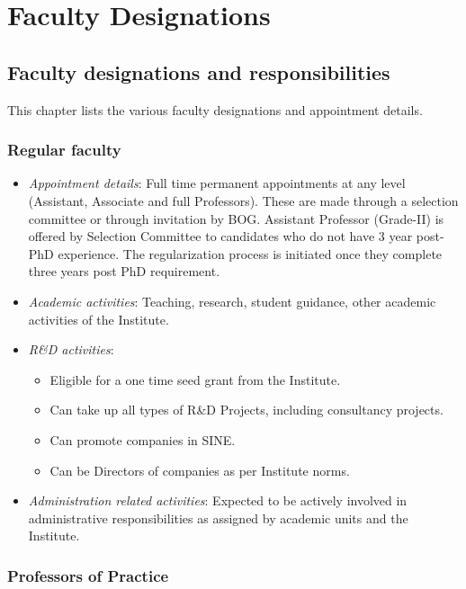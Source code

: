 \documentclass[
  10pt,
  a5paper,
  10pt,
  openany]{amsbook}
\providecommand{\tightlist}{%
  \setlength{\itemsep}{0pt}\setlength{\parskip}{0pt}}
\begin{document}
\part{Faculty Designations}

\chapter{Faculty designations and
responsibilities}\label{sec:facultygrades}

This chapter lists the various faculty designations and appointment
details.

\section{Regular faculty}\label{regular-faculty}

\begin{itemize}
\tightlist
\item
  \emph{Appointment details}: Full time permanent appointments at any
  level (Assistant, Associate and full Professors). These are made
  through a selection committee or through invitation by BOG. Assistant
  Professor (Grade-II) is offered by Selection Committee to candidates
  who do not have 3 year post-PhD experience. The regularization process
  is initiated once they complete three years post PhD requirement.
\item
  \emph{Academic activities}: Teaching, research, student guidance,
  other academic activities of the Institute.
\item
  \emph{R\&D activities}:

  \begin{itemize}
  \tightlist
  \item
    Eligible for a one time seed grant from the Institute.
  \item
    Can take up all types of R\&D Projects, including consultancy
    projects.
  \item
    Can promote companies in SINE.
  \item
    Can be Directors of companies as per Institute norms.
  \end{itemize}
\item
  \emph{Administration related activities}: Expected to be actively
  involved in administrative responsibilities as assigned by academic
  units and the Institute.
\end{itemize}

\section{Professors of Practice}\label{professors-of-practice}
\end{document}
